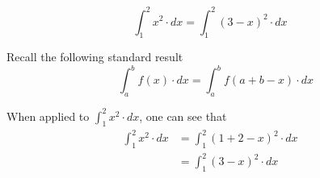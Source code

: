 \documentclass[14pt,fleqn]{extarticle}
\begin{document}
\[ \int_1^2 x^2\cdot dx = \int_1^2 (3-x)^2\cdot dx \]
\newcard 

Recall the following standard result 
\[ \quad \int_a^b f(x)\cdot dx = \int_a^b f(a+b-x)\cdot dx \]

When applied to $\int_1^2 x^2\cdot dx$, one can see that 
\begin{align}
	\int_1^2 x^2\cdot dx &= \int_1^2 \left(1+2-x \right)^2\cdot dx  \\
	&= \int_1^2 \left(3-x \right)^2\cdot dx 
\end{align}
\end{document}
